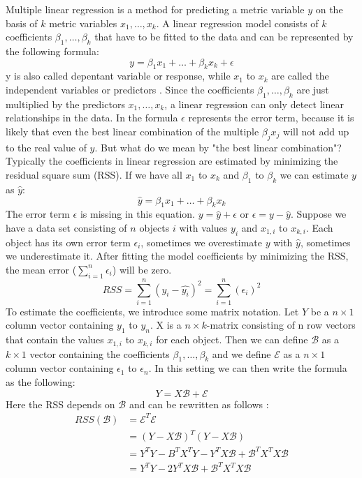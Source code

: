 \documentclass[12 pt]{scrartcl}
\begin{document}
Multiple linear regression is a method for predicting a metric variable $y$ on the basis of $k$ metric variables $x_1, \dots, x_k$. A linear regression model consists of $k$ coefficients $\beta_1, \dots, \beta_k$ that have to be fitted to the data and can be represented by the following formula:
\[ y = \beta_1x_1 + \dots + \beta_kx_k + \epsilon\]
y is also called depentant variable or response, while  $x_1$ to $x_k$ are called the independent variables or predictors \citep[p.~61]{james2013introduction}. Since the coefficients $\beta_1, \dots, \beta_k$ are just multiplied by the predictors $x_1, \dots, x_k$, a linear regression can only detect linear relationships in the data. In the formula $\epsilon$ represents the error term, because it is likely that even the best linear combination of the multiple $\beta_jx_j$ will not add up to the real value of $y$.
But what do we mean by "the best linear combination"? Typically the coefficients in linear regression are estimated by minimizing the residual square sum (RSS). If we have all $x_1$ to $x_k$  and $\beta_1$ to $\beta_k$ we can estimate $y$ as $\hat{y}$:
\[ \hat{y} = \beta_1x_1 + \dots + \beta_kx_k\]
The error term $\epsilon$ is missing in this equation. $y = \hat{y} + \epsilon$ or $\epsilon = y - \hat{y}$.
Suppose we have a data set consisting of $n$ objects $i$ with values $y_i$ and $x_{1,i}$ to $x_{k,i}$. Each object has its own error term $\epsilon_i$, sometimes we overestimate $y$ with $\hat{y}$, sometimes we underestimate it. After fitting the model coefficients by minimizing the RSS, the mean error ($\sum^{n}_{i=1}{\epsilon_i}$) will be zero.
\[RSS = \sum^{n}_{i=1}{(y_i - \hat{y_i})^2} = \sum^{n}_{i=1}{(\epsilon_i)^2} \]
To estimate the coefficients, we  introduce some matrix notation. Let $Y$ be a $n \times 1$ column vector containing $y_1$ to $y_n$. X is a $n \times k$-matrix consisting of n row vectors that contain the values $x_{1,i}$ to $x_{k,i}$ for each object. Then we can define $\mathcal{B}$ as a $k \times 1$ vector containing the coefficients  $\beta_1, \dots, \beta_k$ and we define $\mathcal{E}$ as a $n \times 1$ column vector containing $\epsilon_1$ to $\epsilon_n$.
In this setting we can then write the formula as the following:
\[ Y =  X\mathcal{B} + \mathcal{E}\]
Here the RSS depends on $\mathcal{B}$ and can be rewritten as follows \citep[p.~105]{fahrmeir2013regression}:
\begin{equation} \label{eq2}
  \begin{split}
    RSS(\mathcal{B}) & = \mathcal{E}^T\mathcal{E} \\
    & = (Y-X\mathcal{B})^T(Y-X\mathcal{B}) \\
    & = Y^TY - B^TX^TY - Y^TX\mathcal{B} + \mathcal{B}^TX^TX\mathcal{B} \\
    & = Y^TY   - 2Y^TX\mathcal{B} + \mathcal{B}^TX^TX\mathcal{B} \\
  \end{split}
\end{equation}
\end{document}
